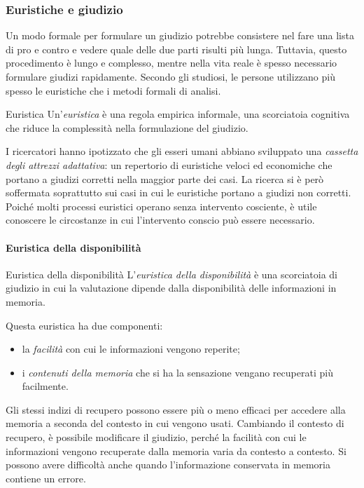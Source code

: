 \documentclass[a4paper]{article}
\begin{document}
\subsubsection{Euristiche e giudizio}
Un modo formale per formulare un giudizio potrebbe consistere nel fare una lista di pro e contro e vedere quale delle due parti risulti più lunga. Tuttavia, questo procedimento è lungo e complesso, mentre nella vita reale è spesso necessario formulare giudizi rapidamente.
Secondo gli studiosi, le persone utilizzano più spesso le euristiche che i metodi formali di analisi.
\begin{snippetdefinition}{Euristica}
    Un'\emph{euristica} è una regola empirica informale, una scorciatoia cognitiva che riduce la complessità nella formulazione del giudizio.
\end{snippetdefinition}
I ricercatori hanno ipotizzato che gli esseri umani abbiano sviluppato una \emph{cassetta degli attrezzi adattativa}: un repertorio di euristiche veloci ed economiche che portano a giudizi corretti nella maggior parte dei casi.
La ricerca si è però soffermata soprattutto sui casi in cui le euristiche portano a giudizi non corretti. Poiché molti processi euristici operano senza intervento cosciente, è utile conoscere le circostanze in cui l'intervento conscio può essere necessario.
\paragraph{Euristica della disponibilità}
\begin{snippetdefinition}{Euristica della disponibilità}
    L'\emph{euristica della disponibilità} è una scorciatoia di giudizio in cui la valutazione dipende dalla disponibilità delle informazioni in memoria.
\end{snippetdefinition}
Questa euristica ha due componenti:
\begin{itemize}
    \item la \emph{facilità} con cui le informazioni vengono reperite;
    \item i \emph{contenuti della memoria} che si ha la sensazione vengano recuperati più facilmente.
\end{itemize}
Gli stessi indizi di recupero possono essere più o meno efficaci per accedere alla memoria a seconda del contesto in cui vengono usati. Cambiando il contesto di recupero, è possibile modificare il giudizio, perché la facilità con cui le informazioni vengono recuperate dalla memoria varia da contesto a contesto.
Si possono avere difficoltà anche quando l'informazione conservata in memoria contiene un errore.
\end{document}
